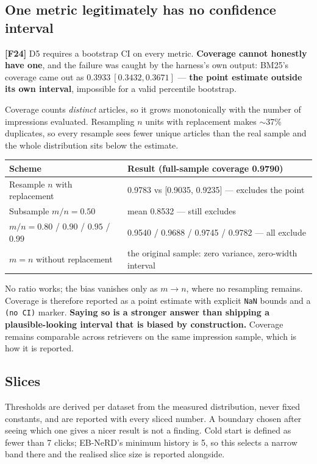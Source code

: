 \documentclass[11pt,a4paper]{article}
\newcommand{\finding}[1]{\textcolor{blue!55!black}{\textbf{[#1]}}}
\begin{document}
\subsection{One metric legitimately has no confidence interval}\label{sec:noci}

\finding{F24} D5 requires a bootstrap CI on every metric. \textbf{Coverage cannot honestly have
one}, and the failure was caught by the harness's own output: BM25's coverage came out as
$0.3933\ [0.3432, 0.3671]$ --- \textbf{the point estimate outside its own interval}, impossible
for a valid percentile bootstrap.

Coverage counts \emph{distinct} articles, so it grows monotonically with the number of impressions
evaluated. Resampling $n$ units with replacement makes $\sim$37\% duplicates, so every resample
sees fewer unique articles than the real sample and the whole distribution sits below the estimate.

\begin{center}\small
\begin{tabular}{ll}
\toprule
Scheme & Result (full-sample coverage 0.9790) \\
\midrule
Resample $n$ with replacement & 0.9783 vs [0.9035, 0.9235] --- excludes the point \\
Subsample $m/n = 0.50$        & mean 0.8532 --- still excludes \\
$m/n = 0.80$ / $0.90$ / $0.95$ / $0.99$ & 0.9540 / 0.9688 / 0.9745 / 0.9782 --- all exclude \\
$m = n$ without replacement   & the original sample: zero variance, zero-width interval \\
\bottomrule
\end{tabular}
\end{center}

No ratio works; the bias vanishes only as $m \rightarrow n$, where no resampling remains.
Coverage is therefore reported as a point estimate with explicit \texttt{NaN} bounds and a
\texttt{(no CI)} marker. \textbf{Saying so is a stronger answer than shipping a plausible-looking
interval that is biased by construction.} Coverage remains comparable across retrievers on the
same impression sample, which is how it is reported.

\subsection{Slices}

Thresholds are derived per dataset from the measured distribution, never fixed constants, and are
reported with every sliced number. A boundary chosen after seeing which one gives a nicer result
is not a finding. Cold start is defined as fewer than 7 clicks; EB-NeRD's minimum history is 5,
so this selects a narrow band there and the realised slice size is reported alongside.
\end{document}
